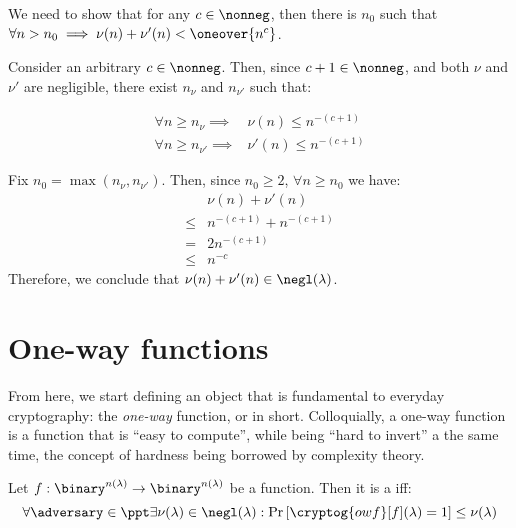 \begin{solution}[\ref{ex:negl}]

    
    We need to show that for any $c \in \nonneg $, then there is $n_0$ such that $\forall n > n_{0} \implies \nu(n) + \nu'(n) < \oneover{n^c}$.
    
    Consider an arbitrary $c \in \nonneg$. Then, since $c + 1 \in \nonneg$, and both $\nu$ and $\nu'$ are negligible, there exist $n_\nu$ and $n_{\nu'}$ such that:
    
    \begin{align*}
        \forall n \geq n_{\nu} \implies& \nu(n) \leq n^{-(c+1)} \\
        \forall n \geq n_{\nu'} \implies& \nu'(n) \leq n^{-(c+1)}
    \end{align*}

    Fix $n_{0} = \max(n_{\nu}, n_{\nu'})$. Then, since $n_0 \geq 2$, $\forall n \geq n_0$ we have:
    \begin{align*}
        & \nu(n) + \nu'(n) \\
        \leq& n^{-(c+1)} + n^{-(c+1)} \\
        =& 2n^{-(c+1)} \\
        \leq& n^{-c}
    \end{align*}
    Therefore, we conclude that $\nu(n) + \nu'(n) \in \negl(\lambda)$.
\end{solution}


\section{One-way functions}

From here, we start defining an object that is fundamental to everyday cryptography: the \emph{one-way} function, or \owf{} in short. Colloquially, a one-way function is a function that is ``easy to compute'', while being ``hard to invert'' a the same time, the concept of hardness being borrowed by complexity theory.

\begin{definition}    
    Let $f : \binary^{n(\lambda)} \to \binary^{n(\lambda)}$ be a function. Then it is a \owf{} iff:
    \[
        \forall \adversary \in \ppt \exists \nu(\lambda) \in \negl(\lambda) : \Pr\left[\cryptog{owf}[f](\lambda) = 1 \right] \leq \nu(\lambda)
    \]
\end{definition}


